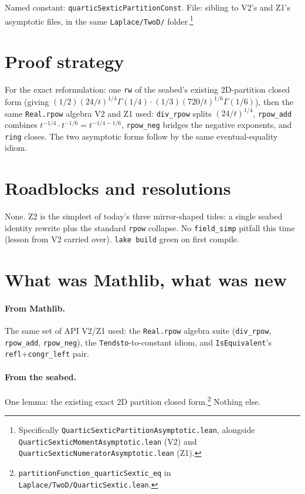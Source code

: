 \documentclass[11pt]{article}
\begin{document}
Named constant: \texttt{quarticSexticPartitionConst}. File:
sibling to V2's and Z1's asymptotic files, in the same
\texttt{Laplace/TwoD/} folder.\footnote{Specifically
\texttt{QuarticSexticPartitionAsymptotic.lean}, alongside
\texttt{QuarticSexticMomentAsymptotic.lean} (V2) and
\texttt{QuarticSexticNumeratorAsymptotic.lean} (Z1).}

\section{Proof strategy}

For the exact reformulation: one \texttt{rw} of the seabed's
existing 2D-partition closed form (giving
$(1/2)(24/t)^{1/4}\Gamma(1/4) \cdot (1/3)(720/t)^{1/6}\Gamma(1/6)$),
then the same \texttt{Real.rpow} algebra V2 and Z1 used:
\texttt{div\_rpow} splits $(24/t)^{1/4}$, \texttt{rpow\_add}
combines $t^{-1/4}\cdot t^{-1/6} = t^{-1/4 - 1/6}$,
\texttt{rpow\_neg} bridges the negative exponents, and \texttt{ring}
closes. The two asymptotic forms follow by the same
eventual-equality idiom.

\section{Roadblocks and resolutions}

None. Z2 is the simplest of today's three mirror-shaped tides: a
single seabed identity rewrite plus the standard \texttt{rpow}
collapse. No \texttt{field\_simp} pitfall this time (lesson from V2
carried over). \texttt{lake build} green on first compile.

\section{What was Mathlib, what was new}

\paragraph{From Mathlib.} The same set of API V2/Z1 used: the
\texttt{Real.rpow} algebra suite (\texttt{div\_rpow},
\texttt{rpow\_add}, \texttt{rpow\_neg}), the
\texttt{Tendsto}-to-constant idiom, and \texttt{IsEquivalent}'s
\texttt{refl}+\texttt{congr\_left} pair.

\paragraph{From the seabed.} One lemma: the existing exact 2D
partition closed form.\footnote{\texttt{partitionFunction\_quarticSextic\_eq}
in \texttt{Laplace/TwoD/QuarticSextic.lean}.} Nothing else.
\end{document}
